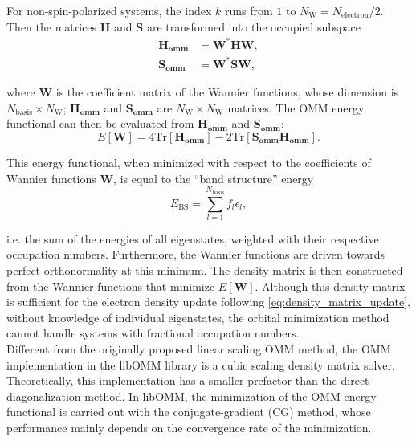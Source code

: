 \documentclass{report}
\begin{document}
For non-spin-polarized systems, the index $k$ runs from $1$ to $N_\text{W} = N_\text{electron}/2$.  Then the matrices $\boldsymbol{H}$ and $\boldsymbol{S}$ are transformed into the occupied subspace\\
\begin{equation}
\label{eq:reduced_ham_ovlp}
\begin{split}
\boldsymbol{H_\text{omm}} & = \boldsymbol{W}^* \boldsymbol{H} \boldsymbol{W} ,\\
\boldsymbol{S_\text{omm}} & = \boldsymbol{W}^* \boldsymbol{S} \boldsymbol{W} ,
\end{split}
\end{equation}

where $\boldsymbol{W}$ is the coefficient matrix of the Wannier functions, whose dimension is $N_\text{basis} \times N_\text{W}$; $\boldsymbol{H_\text{omm}}$ and $\boldsymbol{S_\text{omm}}$ are $N_\text{W} \times N_\text{W}$ matrices.  The OMM energy functional can then be evaluated from $\boldsymbol{H_\text{omm}}$ and $\boldsymbol{S_\text{omm}}$:\\
\begin{equation}
\label{eq:omm_energy}
E[\boldsymbol{W}] = 4 \text{Tr}[\boldsymbol{H_\text{omm}}] - 2 \text{Tr}[\boldsymbol{S_\text{omm} H_\text{omm}}] .
\end{equation}

This energy functional, when minimized with respect to the coefficients of Wannier functions $\boldsymbol{W}$, is equal to the ``band structure'' energy\\
\begin{equation}
\label{eq:bs_energy}
E_\text{BS} = \sum_{l=1}^{N_\text{basis}} f_l \epsilon_l ,
\end{equation}

i.e. the sum of the energies of all eigenstates, weighted with their respective occupation numbers.  Furthermore, the Wannier functions are driven towards perfect orthonormality at this minimum.  The density matrix is then constructed from the Wannier functions that minimize $E[\boldsymbol{W}]$.  Although this density matrix is sufficient for the electron density update following \ref{eq:density_matrix_update}, without knowledge of individual eigenstates, the orbital minimization method cannot handle systems with fractional occupation numbers.\\

Different from the originally proposed linear scaling OMM method, the OMM implementation in the libOMM library \cite{libomm_corsetti_2014} is a cubic scaling density matrix solver.  Theoretically, this implementation has a smaller prefactor than the direct diagonalization method.  In libOMM, the minimization of the OMM energy functional is carried out with the conjugate-gradient (CG) method, whose performance mainly depends on the convergence rate of the minimization.\\
\end{document}
